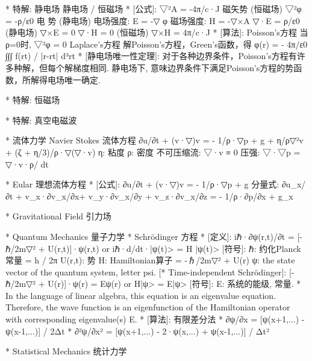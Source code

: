 * 特解: 静电场
静电场  /  恒磁场
*	[公式]: 
		▽²A  = -4π/c·J		磁矢势 (恒磁场)
		▽²φ = -ρ/ε0			电  势 (静电场)
		电场强度: E = -▽ φ
		磁场强度: H = -▽×A
		▽·E = ρ/ε0			(静电场)
		▽×E = 0
		▽·H = 0				(恒磁场)
		▽×H = 4π/c·J
*	[算法]:	Poisson's方程		
		当ρ=0时, ▽²φ = 0		Laplace's方程
		解Poisson's方程，Green's函数，得 φ(r) = - 4π/ε0 ∫∫∫ f(rt) / |r-rt| d³rt
*	[静电场唯一性定理]:
		对于各种边界条件，Poisson's方程有许多种解，但每个解梯度相同.
		静电场下, 意味边界条件下满足Poisson's方程的势函数，所解得电场唯一确定.

* 特解: 恒磁场


* 特解: 真空电磁波



* 流体力学
    Navier Stokes 流体方程
    ∂\vec u/∂t + (\vec v·▽)\vec v =  - 1/ρ·▽p  + \vec g + η/ρ▽²\vec v + (ζ + η/3)/ρ·▽(▽·\vec v)
			η: 粘度    ρ: 密度
			不可压缩流: ▽·\vec v ≡ 0
			压强: ▽·▽p = ▽·v·ρ/ dt

*                   Eular 理想流体方程
*	[公式]: ∂\vec u/∂t + (\vec v·▽)\vec v = - 1/ρ·▽p + \vec g
		分量式:
			∂u_x/∂t + v_x·∂v_x/∂x+ v_y·∂v_x/∂y + v_z·∂v_x/∂z = - 1/ρ·∂p/∂x + g_x


* Gravitational Field 引力场



* Quantum Mechanics 量子力学
*                    Schrödinger 方程
*	[定义]: iℏ·∂ψ(r,t)/∂t = [-ℏ/2m▽² + U(r,t)]·ψ(r,t)
		or	iℏ·d/dt·|ψ(t)> = H |ψ(t)>
		[符号]:
			ℏ: 约化Planck常量 = h / 2π    U(r,t): 势
			H: Hamiltonian算子 = -ℏ/2m▽² + U(r)
			ψ: the state vector of the quantum system, letter psi.
		[* Time-independent Schrödinger]:
			[-ℏ/2m▽² + U(r)]·ψ(r)  = Eψ(r)
		or	H|ψ> = E|ψ>
		[符号]: E: 系统的能级, 常量.
		* In the language of linear algebra, this equation is an eigenvalue equation.
		  Therefore, the wave function is an eigenfunction of the Hamiltonian operator
		  with corresponding eigenvalue(s) E.
*	[算法]: 有限差分法
		* ∂ψ/∂x   = [ψ(x+1,...) - ψ(x-1,...)] / 2Δt
		* ∂²ψ/∂x² = [ψ(x+1,...) - 2·ψ(x,...) + ψ(x-1,...)] / Δt²


* Statistical Mechanics 统计力学






